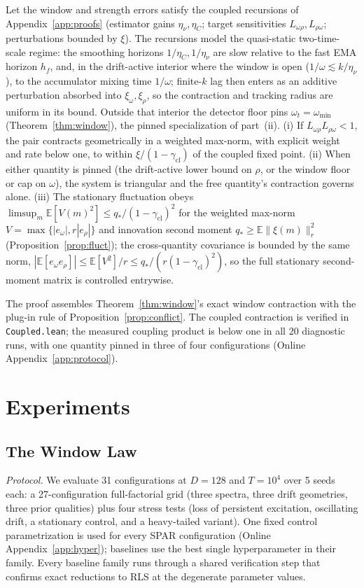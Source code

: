 \documentclass[twoside,11pt]{article}
\newcommand{\E}{\mathbb{E}}
\begin{document}
\begin{theorem}
\label{thm:closedloop}
Let the window and strength errors satisfy the coupled recursions of Appendix~\ref{app:proofs} (estimator gains $\eta_\nu, \eta_C$; target sensitivities $L_{\omega\rho}, L_{\rho\omega}$; perturbations bounded by $\xi$).
The recursions model the quasi-static two-time-scale regime: the smoothing horizons $1/\eta_C, 1/\eta_\nu$ are slow relative to the fast EMA horizon $h_f$, and, in the drift-active interior where the window is open ($1/\omega \lesssim k/\eta_\nu$), to the accumulator mixing time $1/\omega$; finite-$k$ lag then enters as an additive perturbation absorbed into $\xi_\omega,\xi_\rho$, so the contraction and tracking radius are uniform in its bound. Outside that interior the detector floor pins $\omega_t = \omega_{\min}$ (Theorem~\ref{thm:window}), the pinned specialization of part~(ii).
(i) If $L_{\omega\rho} L_{\rho\omega} < 1$, the pair contracts geometrically in a weighted max-norm, with explicit weight and rate below one, to within $\xi/(1-\gamma_{\mathrm{cl}})$ of the coupled fixed point.
(ii) When either quantity is pinned (the drift-active lower bound on $\rho$, or the window floor or cap on $\omega$), the system is triangular and the free quantity's contraction governs alone.
(iii) The stationary fluctuation obeys $\limsup_m \E[V(m)^2] \le q_*/(1 - \gamma_{\mathrm{cl}})^2$ for the weighted max-norm $V = \max\{|e_\omega|, r|e_\rho|\}$ and innovation second moment $q_* \ge \E\|\xi(m)\|_r^2$ (Proposition~\ref{prop:fluct}); the cross-quantity covariance is bounded by the same norm, $|\E[e_\omega e_\rho]| \le \E[V^2]/r \le q_*/(r(1-\gamma_{\mathrm{cl}})^2)$, so the full stationary second-moment matrix is controlled entrywise.
\end{theorem}
The proof assembles Theorem~\ref{thm:window}'s exact window contraction with the plug-in rule of Proposition~\ref{prop:conflict}. The coupled contraction is verified in \texttt{Coupled.lean}; the measured coupling product is below one in all 20 diagnostic runs, with one quantity pinned in three of four configurations (Online Appendix~\ref{app:protocol}).

\section{Experiments}
\label{sec:experiments}

\subsection{The Window Law}
\emph{Protocol.}
We evaluate 31 configurations at $D = 128$ and $T = 10^4$ over 5 seeds each: a 27-configuration full-factorial grid (three spectra, three drift geometries, three prior qualities) plus four stress tests (loss of persistent excitation, oscillating drift, a stationary control, and a heavy-tailed variant).
One fixed control parametrization is used for every SPAR configuration (Online Appendix~\ref{app:hyper}); baselines use the best single hyperparameter in their family.
Every baseline family runs through a shared verification step that confirms exact reductions to RLS at the degenerate parameter values.
\end{document}
